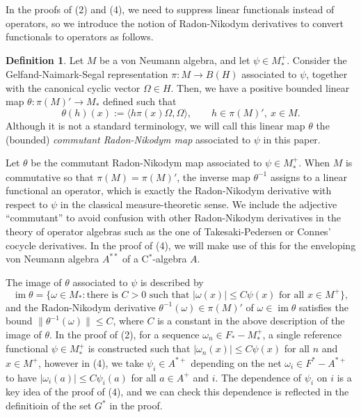 \documentclass[noamsfonts,a4paper,10pt]{amsart}
\theoremstyle{plain}
\theoremstyle{definition}
\newtheorem{definition}[theorem]{Definition}
\begin{document}
In the proofs of (2) and (4), we need to suppress linear functionals instead of operators, so we introduce the notion of Radon-Nikodym derivatives to convert functionals to operators as follows.
\begin{definition}
Let $M$ be a von Neumann algebra, and let $\psi\in M_*^+$.
Consider the Gelfand-Naimark-Segal representation $\pi:M\to B(H)$ associated to $\psi$, together with the canonical cyclic vector $\Omega\in H$.
Then, we have a positive bounded linear map $\theta:\pi(M)'\to M_*$ defined such that
\[\theta(h)(x):=\langle h\pi(x)\Omega,\Omega\rangle,\qquad h\in\pi(M)',\ x\in M.\]
Although it is not a standard terminology, we will call this linear map $\theta$ the (bounded) \emph{commutant Radon-Nikodym map} associated to $\psi$ in this paper.
\end{definition}
Let $\theta$ be the commutant Radon-Nikodym map associated to $\psi\in M_*^+$.
When $M$ is commutative so that $\pi(M)=\pi(M)'$, the inverse map $\theta^{-1}$ assigns to a linear functional an operator, which is exactly the Radon-Nikodym derivative with respect to $\psi$ in the classical measure-theoretic sense.
We include the adjective ``commutant'' to avoid confusion with other Radon-Nikodym derivatives in the theory of operator algebras such as the one of Takesaki-Pedersen or Connes' cocycle derivatives.
In the proof of (4), we will make use of this for the enveloping von Neumann algebra $A^{**}$ of a C$^*$-algebra $A$.

The image of $\theta$ associated to $\psi$ is described by
\[\operatorname{im}\theta=\{\omega\in M_*:\text{there is $C>0$ such that $|\omega(x)|\le C\psi(x)$ for all $x\in M^+$}\},\]
and the Radon-Nikodym derivative $\theta^{-1}(\omega)\in\pi(M)'$ of $\omega\in\operatorname{im}\theta$ satisfies the bound $\|\theta^{-1}(\omega)\|\le C$, where $C$ is a constant in the above description of the image of $\theta$.
In the proof of (2), for a sequence $\omega_n\in F_*-M_*^+$, a single reference functional $\psi\in M_*^+$ is constructed such that $|\omega_n(x)|\le C\psi(x)$ for all $n$ and $x\in M^+$, however in (4), we take $\psi_i\in A^{*+}$ depending on the net $\omega_i\in F^*-A^{*+}$ to have $|\omega_i(a)|\le C\psi_i(a)$ for all $a\in A^+$ and $i$.
The dependence of $\psi_i$ on $i$ is a key idea of the proof of (4), and we can check this dependence is reflected in the definitioin of the set $G^*$ in the proof.
\end{document}
